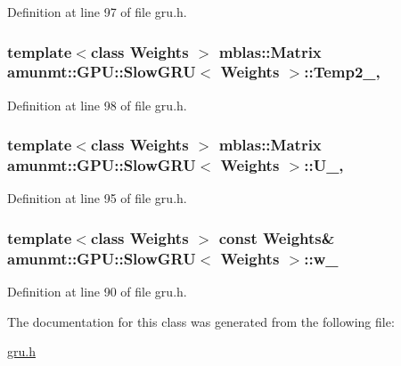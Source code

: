 Definition at line 97 of file gru.\+h.

\subsubsection[{\texorpdfstring{Temp2\+\_\+}{Temp2_}}]{\setlength{\rightskip}{0pt plus 5cm}template$<$class Weights $>$ {\bf mblas\+::\+Matrix} {\bf amunmt\+::\+G\+P\+U\+::\+Slow\+G\+RU}$<$ {\bf Weights} $>$\+::Temp2\+\_\+\hspace{0.3cm}{\ttfamily [mutable]}, {\ttfamily [private]}}\hypertarget{classamunmt_1_1GPU_1_1SlowGRU_a8db5f7a9fedce4e8ba545753e2e61c60}{}\label{classamunmt_1_1GPU_1_1SlowGRU_a8db5f7a9fedce4e8ba545753e2e61c60}


Definition at line 98 of file gru.\+h.

\subsubsection[{\texorpdfstring{U\+\_\+}{U_}}]{\setlength{\rightskip}{0pt plus 5cm}template$<$class Weights $>$ {\bf mblas\+::\+Matrix} {\bf amunmt\+::\+G\+P\+U\+::\+Slow\+G\+RU}$<$ {\bf Weights} $>$\+::U\+\_\+\hspace{0.3cm}{\ttfamily [mutable]}, {\ttfamily [private]}}\hypertarget{classamunmt_1_1GPU_1_1SlowGRU_a1fe150f08247927994f75bd79f27a127}{}\label{classamunmt_1_1GPU_1_1SlowGRU_a1fe150f08247927994f75bd79f27a127}


Definition at line 95 of file gru.\+h.

\subsubsection[{\texorpdfstring{w\+\_\+}{w_}}]{\setlength{\rightskip}{0pt plus 5cm}template$<$class Weights $>$ const {\bf Weights}\& {\bf amunmt\+::\+G\+P\+U\+::\+Slow\+G\+RU}$<$ {\bf Weights} $>$\+::w\+\_\+\hspace{0.3cm}{\ttfamily [private]}}\hypertarget{classamunmt_1_1GPU_1_1SlowGRU_a1391f44c8e8b746675cf8576401c8a71}{}\label{classamunmt_1_1GPU_1_1SlowGRU_a1391f44c8e8b746675cf8576401c8a71}


Definition at line 90 of file gru.\+h.



The documentation for this class was generated from the following file\+:\begin{DoxyCompactItemize}
\item 
\hyperlink{gru_8h}{gru.\+h}\end{DoxyCompactItemize}
